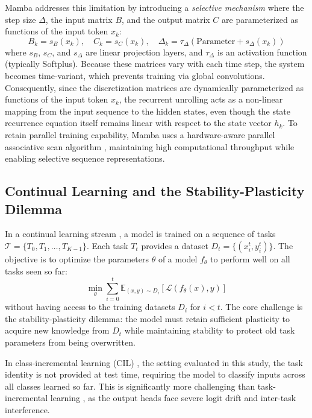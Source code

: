 Mamba \cite{guMambaLinearTimeSequence2024} addresses this limitation by introducing a \textit{selective mechanism} where the step size $\Delta$, the input matrix $B$, and the output matrix $C$ are parameterized as functions of the input token $x_k$:
\begin{equation}
    B_k = s_B(x_k), \quad C_k = s_C(x_k), \quad \Delta_k = \tau_{\Delta}(\text{Parameter} + s_{\Delta}(x_k))
    \label{eq:mamba_selectivity}
\end{equation}
where $s_B$, $s_C$, and $s_{\Delta}$ are linear projection layers, and $\tau_{\Delta}$ is an activation function (typically Softplus). Because these matrices vary with each time step, the system becomes time-variant, which prevents training via global convolutions. Consequently, since the discretization matrices are dynamically parameterized as functions of the input token $x_k$, the recurrent unrolling acts as a non-linear mapping from the input sequence to the hidden states, even though the state recurrence equation itself remains linear with respect to the state vector $h_k$. To retain parallel training capability, Mamba uses a hardware-aware parallel associative scan algorithm \cite{guMambaLinearTimeSequence2024}, maintaining high computational throughput while enabling selective sequence representations.

\subsection{Continual Learning and the Stability-Plasticity Dilemma}
In a continual learning stream \cite{wangComprehensiveSurveyContinual2024}, a model is trained on a sequence of tasks $\mathcal{T} = \{T_0, T_1, \dots, T_{K-1}\}$. Each task $T_t$ provides a dataset $D_t = \{(x_i^t, y_i^t)\}$. The objective is to optimize the parameters $\theta$ of a model $f_\theta$ to perform well on all tasks seen so far:
\begin{equation}
    \min_\theta \sum_{i=0}^{t} \mathbb{E}_{(x, y) \sim D_i} \left[ \mathcal{L}(f_\theta(x), y) \right]
    \label{eq:cl_objective}
\end{equation}
without having access to the training datasets $D_i$ for $i < t$. The core challenge is the stability-plasticity dilemma: the model must retain sufficient plasticity to acquire new knowledge from $D_t$ while maintaining stability to protect old task parameters from being overwritten. 

In class-incremental learning (CIL) \cite{venThreeScenariosContinual2019}, the setting evaluated in this study, the task identity is not provided at test time, requiring the model to classify inputs across all classes learned so far. This is significantly more challenging than task-incremental learning \cite{venThreeScenariosContinual2019}, as the output heads face severe logit drift and inter-task interference.

